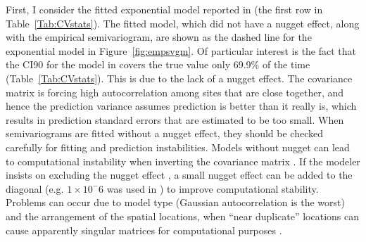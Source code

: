\documentclass[11pt, titlepage]{article}\usepackage[]{graphicx}\usepackage[]{color}
\begin{document}
\begin{spacing}{1.9}
\begin{flushleft}
First, I consider the fitted exponential model reported in \citet{Ladl:Avga:Whea:Boyc:pred:2016} (the first row in Table~\ref{Tab:CVstats}).  The fitted model, which did not have a nugget effect, along with the empirical semivariogram, are shown as the dashed line for the exponential model in Figure~\ref{fig:empsvgm}.  Of particular interest is the fact that the CI90 for the model in \citet{Ladl:Avga:Whea:Boyc:pred:2016} covers the true value only 69.9\% of the time (Table~\ref{Tab:CVstats}). This is due to the lack of a nugget effect. The covariance matrix is forcing high autocorrelation among sites that are close together, and hence the prediction variance assumes prediction is better than it really is, which results in prediction standard errors that are estimated to be too small. When semivariograms are fitted without a nugget effect, they should be checked carefully for fitting and prediction instabilities. Models without nugget can lead to computational instability when inverting the covariance matrix \citep{Diam:Arms:robu:1984,Posa:cond:1989,ODow:cond:1991,Abab:cond:1994}. If the modeler insists on excluding the nugget effect \citep[as often occurs when using kriging to approximate deterministic computer models, e.g.][]{Mart:Simp:krig:2005}, a small nugget effect can be added to the diagonal (e.g. $1 \times 10^-6$ was used in \citet{Book:Denn:Fran:Sera:etal:rigo:1999}) to improve computational stability.  Problems can occur due to model type (Gaussian autocorrelation is the worst) and the arrangement of the spatial locations, when ``near duplicate'' locations can cause apparently singular matrices for computational purposes \citep[][p. 220]{Biva:Pebe:Gome:appl:2008}.


\end{flushleft}
\end{spacing}
\end{document}
